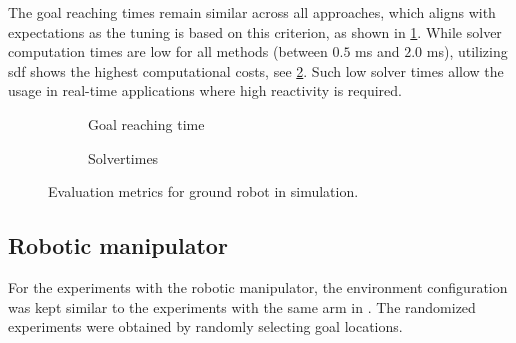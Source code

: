 The goal reaching times remain similar across all approaches, which aligns with
expectations as the tuning is based on this criterion, as shown in
\cref{subfig:point_robot_sim_time2Goal}. While solver computation times are low
for all methods (between $0.5$ ms and $2.0$ ms), utilizing
\ac{sdf} shows the highest computational costs, see
\cref{subfig:point_robot_sim_solvertimes}. Such low solver
times allow the usage in real-time applications where high
reactivity is required.
%
\begin{figure*}
  \centering
  
  \caption{Success rates for ground robot in static
  environments for different noise level on sensor inputs.
  }%
  \label{fig:point_robot_sim_success_static}
\end{figure*}
%
\begin{figure*}
  \centering
  
  \caption{Success rates for ground robot in dynamic
  environments for different noise level on sensor inputs.
  }%
  \label{fig:point_robot_sim_success_dynamic}
\end{figure*}
%
\begin{figure}[ht]
  \centering
  \begin{subfigure}{0.48\linewidth}
    \centering
    
    \caption{Goal reaching time}%
    \label{subfig:point_robot_sim_time2Goal}
  \end{subfigure}
  \begin{subfigure}{0.48\linewidth}
    \centering
    
    \caption{Solvertimes}%
    \label{subfig:point_robot_sim_solvertimes}
  \end{subfigure}%
  \caption{Evaluation metrics for ground robot in simulation.
  }%
  \label{fig:point_robot_sim_metrics}
\end{figure}

\subsection{Robotic manipulator}
\label{sub:manipulator}
%
For the experiments with the robotic manipulator, the
environment configuration was kept similar to the
experiments with the same arm in \cite{bhardwaj2022storm}.
The randomized experiments were obtained by randomly
selecting goal locations.
%
\begin{figure*}
  \centering
  
  \caption{Success rates for robotic manipulator in static
  environments for different noise level on sensor inputs.
  }%
  \label{fig:panda_robot_sim_success_static}
\end{figure*}
%

